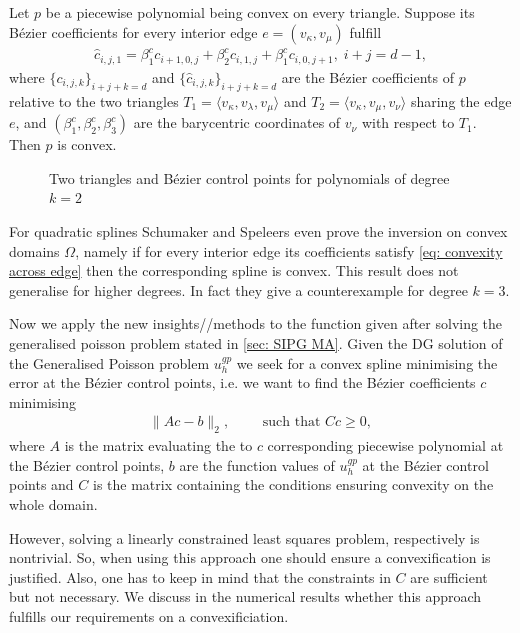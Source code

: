 \begin{theorem}\label{thm: convex cond across edge}
	Let $p$ be a piecewise polynomial being convex on every triangle. Suppose its B\'ezier coefficients for every interior edge $e =(v_\kappa, v_\mu)$ fulfill 
	\begin{align}
		{\hat c_{i,j,1}} = \beta_1^c c_{i+1, 0,j} +\beta_2^c c_{i,1,j} + \beta_1^c c_{i, 0,j+1}, \; i+j=d-1, \label{eq: convexity across edge}
	\end{align}
where  $\{c_{i,j,k}\}_{i+j+k=d}$ and $\{ {\hat c_{i,j,k}}\}_{i+j+k=d}$ are the B\'ezier coefficients of $p$ relative to the two triangles $T_1 = \langle v_\kappa, v_\lambda, v_\mu \rangle$ and $T_2 = \langle v_\kappa, v_\mu, v_\nu \rangle$ sharing the edge $e$, and $(\beta_1^c,\beta_2^c,\beta_3^c)$ are the barycentric coordinates of $v_\nu$ with respect to $T_1$. Then $p$ is convex.
\end{theorem}

\begin{figure}[h]
	
	\caption{Two triangles and B\'ezier control points for polynomials of degree $k=2$}
\end{figure}

For quadratic splines Schumaker and Speleers even prove the inversion on convex domains $\Omega$, namely if for every interior edge its coefficients satisfy \eqref{eq: convexity across edge} then the corresponding spline is convex.
This result does not generalise for higher degrees. In fact they give a counterexample for degree $k = 3$.

Now we apply the new insights//methods to the function given after solving the generalised poisson problem stated in \ref{sec: SIPG MA}.
Given the DG solution of the Generalised Poisson problem $u^{gp}_h$ we seek for a convex spline minimising the error at the B\'ezier control points, i.e. we want to find the B\'ezier coefficients $c$ minimising
\begin{align}
		\lVert A c - b \rVert_2, \qquad \text{ such that } Cc \geq 0, \label{eq: convex lsq}
\end{align}
where $A$ is the matrix evaluating the to $c$ corresponding piecewise polynomial at the B\'ezier control points, $b$ are the function values of $u^{gp}_h$ at the B\'ezier control points and $C$ is the matrix containing the conditions ensuring convexity on the whole domain.

However, solving a linearly constrained least squares problem, respectively is nontrivial. So, when using this approach one should ensure a convexification is justified. Also, one has to keep in mind that the constraints in $C$ are sufficient but not necessary. We discuss in the numerical results whether this approach fulfills our requirements on a convexificiation.


